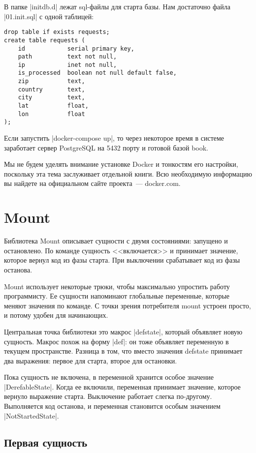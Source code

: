 В папке \spverb|initdb.d| лежат sql-файлы для старта базы. Нам достаточно файла
\spverb|01.init.sql| с одной таблицей:

\begin{verbatim}
drop table if exists requests;
create table requests (
    id            serial primary key,
    path          text not null,
    ip            inet not null,
    is_processed  boolean not null default false,
    zip           text,
    country       text,
    city          text,
    lat           float,
    lon           float
);
\end{verbatim}

Если запустить \spverb|docker-compose up|, то через некоторое время в системе
заработает сервер PostgreSQL на 5432 порту и готовой базой book.

Мы не будем уделять внимание установке Docker и тонкостям его настройки,
поскольку эта тема заслуживает отдельной книги. Всю необходимую информацию вы
найдете на официальном сайте проекта~--- docker.com.

\section{Mount}

Библиотека Mount описывает сущности с
двумя состояниями: запущено и остановлено. По команде сущность <<включается>> и
принимает значение, которое вернул код из фазы старта. При выключении
срабатывает код из фазы останова.

Mount использует некоторые трюки, чтобы максимально упростить работу
программисту. Ее сущности напоминают глобальные переменные, которые меняют
значения по команде. С точки зрения потребителя mount устроен просто, и потому
удобен для начинающих.

Центральная точка библиотеки это макрос \spverb|defstate|, который объявляет новую
сущность. Макрос похож на форму \spverb|def|: он тоже объявляет переменную в текущем
пространстве. Разница в том, что вместо значения defstate принимает два
выражения: первое для старта, второе для остановки.

Пока сущность не включена, в переменной хранится особое значение
\spverb|DerefableState|. Когда ее включили, переменная принимает значение, которое
вернуло выражение старта. Выключение работает слегка по-другому. Выполняется код
останова, и переменная становится особым значением \spverb|NotStartedState|.

\subsection{Первая сущность}


